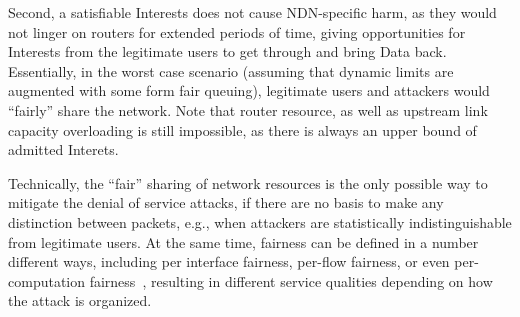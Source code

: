 Second, a satisfiable Interests does not cause NDN-specific harm, as they would not linger on routers for extended periods of time, giving opportunities for Interests from the legitimate users to get through and bring Data back.
Essentially, in the worst case scenario (assuming that dynamic limits are augmented with some form fair queuing), legitimate users and attackers would ``fairly'' share the network.
Note that router resource, as well as upstream link capacity overloading is still impossible, as there is always an upper bound of admitted Interets.


Technically, the ``fair'' sharing of network resources is the only possible way to mitigate the denial of service attacks, if there are no basis to make any distinction between packets, e.g., when attackers are statistically indistinguishable from legitimate users.
At the same time, fairness can be defined in a number different ways, including per interface fairness, per-flow fairness, or even per-computation fairness~\cite{Capabilities, Portcullis}, resulting in different service qualities depending on how the attack is organized.


